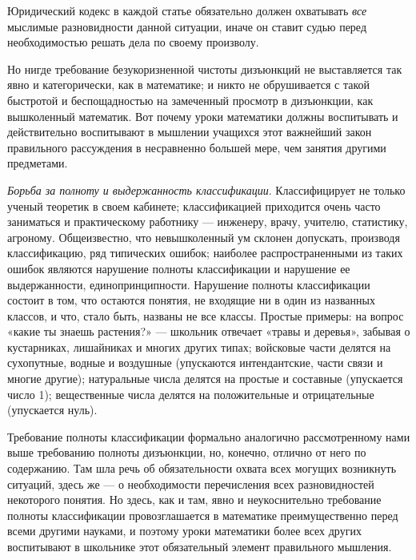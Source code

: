 \documentclass[12pt, a4paper, openany]{book}
\begin{document}
Юридический кодекс в каждой статье обязательно  должен охватывать \textit{все} мыслимые разновидности данной  ситуации, иначе он ставит судью перед необходимостью  решать дела по своему произволу. 

Но нигде требование безукоризненной чистоты  дизъюнкций не выставляется так явно и категорически, как в  математике; и никто не обрушивается с такой быстротой и беспощадностью на замеченный просмотр в дизъюнкции, как вышколенный математик. Вот почему уроки  математики должны воспитывать и действительно воспитывают в мышлении учащихся этот важнейший закон правильного рассуждения в несравненно большей мере, чем занятия другими предметами. 

\textit{Борьба за полноту и выдержанность классификации}. Классифицирует не только ученый теоретик в своем  кабинете; классификацией приходится очень часто заниматься и практическому работнику — инженеру, врачу, учителю, статистику, агроному. Общеизвестно, что невышколенный ум склонен допускать, производя классификацию, ряд типических ошибок; наиболее распространенными из таких ошибок являются нарушение полноты  классификации и нарушение ее выдержанности, единопринципности. Нарушение полноты классификации состоит в том, что остаются понятия, не входящие ни в один из названных классов, и что, стало быть, названы не все классы. Простые примеры: на вопрос «какие ты знаешь растения?» — школьник отвечает «травы и деревья», забывая о  кустарниках, лишайниках и многих других типах; войсковые части делятся на сухопутные, водные и воздушные  (упускаются интендантские, части связи и многие другие);  натуральные числа делятся на простые и составные (упускается число 1); вещественные числа делятся на положительные и отрицательные (упускается нуль). 

Требование полноты классификации формально  аналогично рассмотренному нами выше требованию полноты дизъюнкции, но, конечно, отлично от него по содержанию. Там шла речь об обязательности охвата всех могущих  возникнуть ситуаций, здесь же — о необходимости  перечисления всех разновидностей некоторого понятия. Но здесь, как и там, явно и неукоснительно требование  полноты классификации провозглашается в математике  преимущественно перед всеми другими науками, и поэтому уроки математики более всех других воспитывают в  школьнике этот обязательный элемент правильного мышления.
\end{document}
